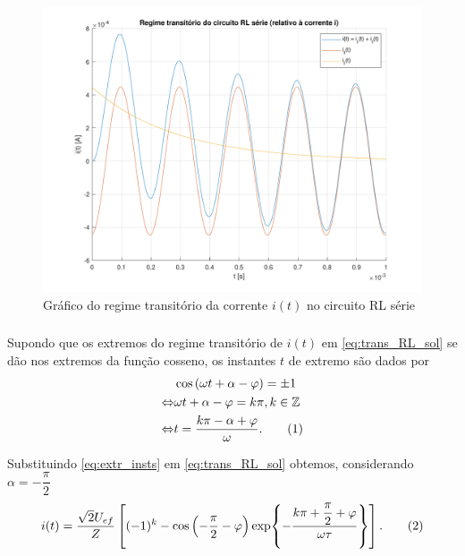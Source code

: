 \documentclass[a4paper, titlepage, portuguese]{article}
\newcommand{\eq}{\Leftrightarrow} %
\newcommand\numberthis{\addtocounter{equation}{1}\tag{\theequation}}
\begin{document}
		\begin{figure}[H]
			\centering
			\includegraphics[width=1.0\linewidth]{rl.pdf}
			\caption{Gráfico do regime transitório da corrente $i(t)$ no circuito RL série}
			\label{fig:rl}
		\end{figure}

	\subsubsection{}
	\par
	Supondo que os extremos do regime transitório de $i(t)$ em \eqref{eq:trans_RL_sol} se dão nos extremos da função cosseno, os instantes $t$ de extremo são dados por
	\begin{align*}
		&\cos\left(\omega t + \alpha - \varphi\right) = \pm 1 \\ \eq
		&\omega t + \alpha - \varphi = k\pi, k \in \mathbb{Z} \\ \eq
		&t = \dfrac{k\pi - \alpha + \varphi}{\omega}. \numberthis \label{eq:extr_insts}
	\end{align*}
	\par
	Substituindo \eqref{eq:extr_insts} em \eqref{eq:trans_RL_sol} obtemos, considerando $\alpha = -\dfrac{\pi}{2}$
	\begin{align*}
		i(t) = \dfrac{\sqrt{2}U_{ef}}{Z} \left[(-1)^k - \cos\left(-\dfrac{\pi}{2} - \varphi\right)\exp{-\dfrac{k\pi + \dfrac{\pi}{2} + \varphi}{\omega\tau}}\right].\numberthis \label{eq:extr}
	\end{align*}

\end{document}
